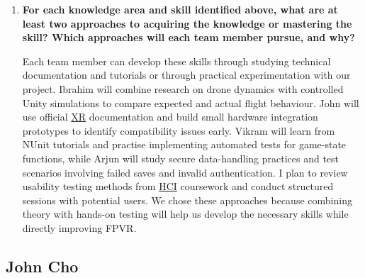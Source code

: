 \documentclass[12pt, titlepage]{article}
\begin{document}
\begin{enumerate}
    \item \textbf{For each knowledge area and skill identified above, what are at least two approaches to acquiring the knowledge or mastering the skill? Which approaches will each team member pursue, and why?}

    Each team member can develop these skills through studying technical documentation and tutorials or through practical experimentation with our project. Ibrahim will combine research on drone dynamics with controlled Unity simulations to compare expected and actual flight behaviour. John will use official \hyperlink{abbr:XR}{XR} documentation and build small hardware integration prototypes to identify compatibility issues early. Vikram will learn from NUnit tutorials and practise implementing automated tests for game-state functions, while Arjun will study secure data-handling practices and test scenarios involving failed saves and invalid authentication. I plan to review usability testing methods from \hyperlink{abbr:HCI}{HCI} coursework and conduct structured sessions with potential users. We chose these approaches because combining theory with hands-on testing will help us develop the necessary skills while directly improving FPVR.
\end{enumerate}

\subsection*{John Cho}
\end{document}

